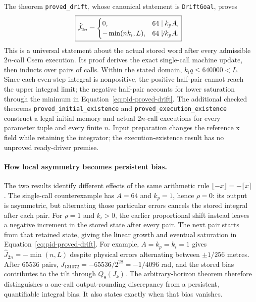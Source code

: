 \documentclass[manuscript, screen, review]{acmart}
\begin{document}
The theorem \texttt{proved\_\allowbreak drift}, whose canonical statement is
\texttt{DriftGoal}, proves
\begin{equation}
 \boxed{
 \widehat J_{2n}=
 \begin{cases}
 0,&64\mid k_pA,\\
 -\min(nk_i,L),&64\not\mid k_pA .
 \end{cases}}
 \label{eq:pid-proved-drift}
\end{equation}
This is a universal statement about the actual stored word after every
admissible $2n$-call Csem execution. Its proof derives the exact single-call
machine update, then inducts over pairs of calls. Within the stated
domain, $k_iq\le640000<L$. Since each even-step integral is nonpositive,
the positive half-pair cannot reach the upper integral limit; the negative
half-pair accounts for lower saturation through the minimum in
Equation~\eqref{eq:pid-proved-drift}.
The additional checked theorems
\texttt{proved\_\allowbreak initial\_\allowbreak existence} and
\texttt{proved\_\allowbreak execution\_\allowbreak existence} construct a legal initial memory
and actual $2n$-call executions for every parameter tuple and every
finite $n$. Input preparation changes the reference x field while
retaining the integrator; the execution-existence result has no
unproved ready-driver premise.

\paragraph{How local asymmetry becomes persistent bias.}
The two results identify different effects of the same arithmetic rule
$\lfloor-x\rfloor=-\lceil x\rceil$.
The single-call counterexample has $A=64$ and $k_p=1$, hence $\rho=0$:
its output is asymmetric, but alternating those particular errors
cancels the stored integral after each pair.
For $\rho=1$ and $k_i>0$, the earlier proportional shift instead
leaves a negative increment in the stored state after every pair.
The next pair starts from that retained state, giving the linear
growth and eventual saturation in Equation~\eqref{eq:pid-proved-drift}.
For example, $A=k_p=k_i=1$ gives
$\widehat J_{2n}=-\min(n,L)$ despite physical errors alternating
between $\pm1/256$ metres. After $65536$ pairs,
$J_{131072}=-65536/2^{28}=-1/4096$ rad, and the stored bias contributes
to the tilt through $Q_\theta(J_k)$.
The arbitrary-horizon theorem therefore distinguishes a one-call
output-rounding discrepancy from a persistent, quantifiable integral
bias. It also states exactly when that bias vanishes.
\end{document}
